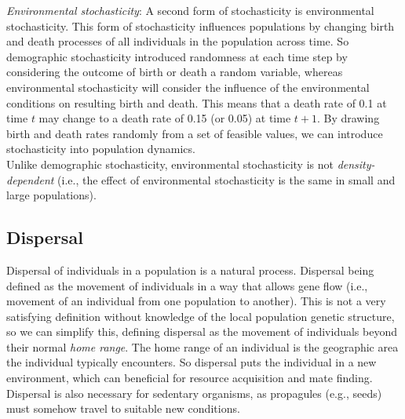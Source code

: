 \documentclass[12pt]{article}
\begin{document}
\bigskip

\textit{Environmental stochasticity}: 
A second form of stochasticity is environmental stochasticity. This form of stochasticity influences populations by changing birth and death processes of all individuals in the population across time. So demographic stochasticity introduced randomness at each time step by considering the outcome of birth or death a random variable, whereas environmental stochasticity will consider the influence of the environmental conditions on resulting birth and death. This means that a death rate of 0.1 at time $t$ may change to a death rate of 0.15 (or 0.05) at time $t+1$. By drawing birth and death rates randomly from a set of feasible values, we can introduce stochasticity into population dynamics. \\


Unlike demographic stochasticity, environmental stochasticity is not \textit{density-dependent} (i.e., the effect of environmental stochasticity is the same in small and large populations). 





















\clearpage

\subsection*{Dispersal}

Dispersal of individuals in a population is a natural process. Dispersal being defined as the movement of individuals in a way that allows gene flow (i.e., movement of an individual from one population to another). This is not a very satisfying definition without knowledge of the local population genetic structure, so we can simplify this, defining dispersal as the movement of individuals beyond their normal \textit{home range}. The home range of an individual is the geographic area the individual typically encounters. So dispersal puts the individual in a new environment, which can beneficial for resource acquisition and mate finding. Dispersal is also necessary for sedentary organisms, as propagules (e.g., seeds) must somehow travel to suitable new conditions. \\
\end{document}
